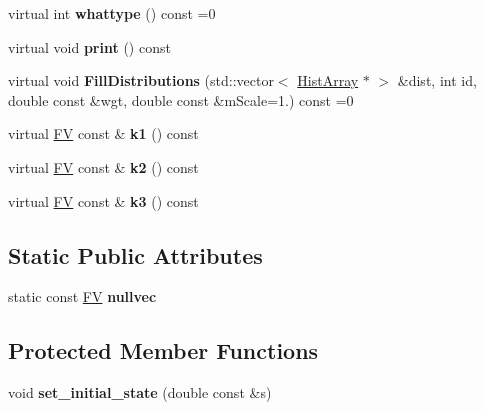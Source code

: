 \begin{DoxyCompactItemize}
\item 
\hypertarget{classPS__2_ac3bb7468d7b1e1b62018f13a1121e86a}{virtual int {\bfseries whattype} () const =0}\label{classPS__2_ac3bb7468d7b1e1b62018f13a1121e86a}

\item 
\hypertarget{classPS__2_a395f9455cfdebcfd145ba679c43ac2c5}{virtual void {\bfseries print} () const }\label{classPS__2_a395f9455cfdebcfd145ba679c43ac2c5}

\item 
\hypertarget{classPS__2_a66a9dc1e77a262f05f8b917003259c31}{virtual void {\bfseries Fill\-Distributions} (std\-::vector$<$ \hyperlink{classHistArray}{Hist\-Array} $\ast$ $>$ \&dist, int id, double const \&wgt, double const \&m\-Scale=1.) const =0}\label{classPS__2_a66a9dc1e77a262f05f8b917003259c31}

\item 
\hypertarget{classPS__2_a1a073b4fd3fafa46dceabcf77f4b3c44}{virtual \hyperlink{classFV}{F\-V} const \& {\bfseries k1} () const }\label{classPS__2_a1a073b4fd3fafa46dceabcf77f4b3c44}

\item 
\hypertarget{classPS__2_a9caf1d80ebd0718a226e05bf42cfa4c9}{virtual \hyperlink{classFV}{F\-V} const \& {\bfseries k2} () const }\label{classPS__2_a9caf1d80ebd0718a226e05bf42cfa4c9}

\item 
\hypertarget{classPS__2_aaa94aa598e69a134fab3bc2fc6c3185b}{virtual \hyperlink{classFV}{F\-V} const \& {\bfseries k3} () const }\label{classPS__2_aaa94aa598e69a134fab3bc2fc6c3185b}

\end{DoxyCompactItemize}
\subsection*{Static Public Attributes}
\begin{DoxyCompactItemize}
\item 
\hypertarget{classPS__2_af361ee1bfe02e206f8845db7f1da57c6}{static const \hyperlink{classFV}{F\-V} {\bfseries nullvec}}\label{classPS__2_af361ee1bfe02e206f8845db7f1da57c6}

\end{DoxyCompactItemize}
\subsection*{Protected Member Functions}
\begin{DoxyCompactItemize}
\item 
\hypertarget{classPS__2_a6d49cef4b1eb1138b947c9ec9b448538}{void {\bfseries set\-\_\-initial\-\_\-state} (double const \&s)}\label{classPS__2_a6d49cef4b1eb1138b947c9ec9b448538}

\end{DoxyCompactItemize}
